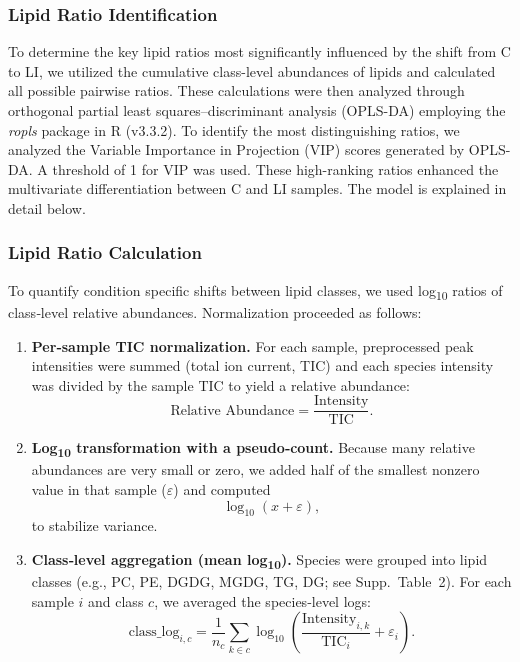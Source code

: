 \documentclass[10pt,letterpaper]{article}
\begin{document}
\begin{itemize}
\subsubsection*{Lipid Ratio Identification}
To determine the key lipid ratios most significantly influenced by the shift from C to LI, we utilized the cumulative class-level abundances of lipids and calculated all possible pairwise ratios. These calculations were then analyzed through orthogonal partial least squares–discriminant analysis (OPLS-DA) employing the \emph{ropls} package in R (v3.3.2). To identify the most distinguishing ratios, we analyzed the Variable Importance in Projection (VIP) scores generated by OPLS-DA. A threshold of 1 for VIP was used. These high-ranking ratios enhanced the multivariate differentiation between C and LI samples. The model is explained in detail below. 

\subsubsection*{Lipid Ratio Calculation}

To quantify condition specific shifts between lipid classes, we used  log\textsubscript{10} ratios of class‐level relative abundances. Normalization proceeded as follows:

\begin{enumerate}
\item \textbf{Per‐sample TIC normalization.}  
For each sample, preprocessed peak intensities were summed (total ion current, TIC) and each species intensity was divided by the sample TIC to yield a relative abundance:
\[
\text{Relative Abundance} = \frac{\text{Intensity}}{\text{TIC}}.
\]

\item \textbf{Log\textsubscript{10} transformation with a pseudo‐count.}  
Because many relative abundances are very small or zero, we added half of the smallest nonzero value in that sample ($\varepsilon$) and computed 
\[
\log_{10}(x + \varepsilon),
\]
to stabilize variance.

\item \textbf{Class‐level aggregation (mean log\textsubscript{10}).}  
Species were grouped into lipid classes (e.g., PC, PE, DGDG, MGDG, TG, DG; see Supp.\ Table~2).  
For each sample $i$ and class $c$, we averaged the species‐level logs:
\[
\text{class\_log}_{i,c} = \frac{1}{n_c} \sum_{k \in c} \log_{10}\!\left(\frac{\text{Intensity}_{i,k}}{\text{TIC}_i} + \varepsilon_i\right).
\]
\end{enumerate}


\end{itemize}
\end{document}

